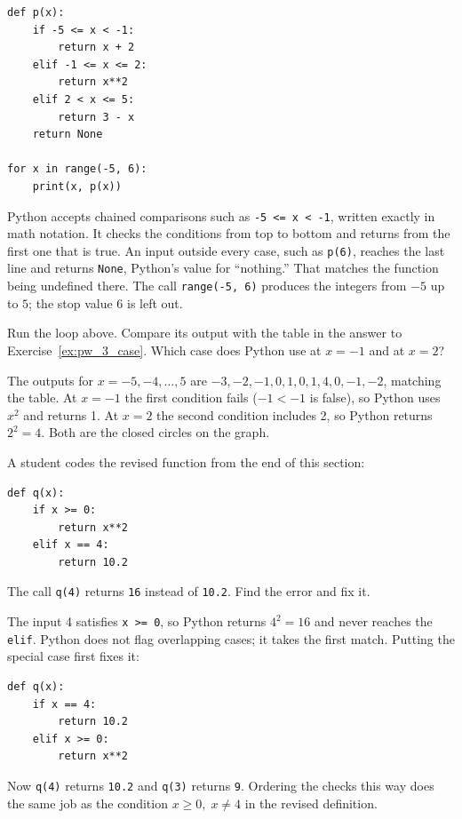 \begin{verbatim}
def p(x):
    if -5 <= x < -1:
        return x + 2
    elif -1 <= x <= 2:
        return x**2
    elif 2 < x <= 5:
        return 3 - x
    return None

for x in range(-5, 6):
    print(x, p(x))
\end{verbatim}

Python accepts chained comparisons such as \texttt{-5 <= x < -1},
written exactly in math notation. It checks the conditions from top to bottom
and returns from the first one that is true. An input outside every case,
such as \texttt{p(6)}, reaches the last line and returns
\texttt{None}, Python's value for ``nothing.'' That matches the
function being undefined there. The call \texttt{range(-5, 6)}
produces the integers from $-5$ up to $5$; the stop value 6 is left out.

\begin{Exercise}[title={Checking the table}, label={ex:functions-python-6}]
  Run the loop above. Compare its output with the table in the answer to
  Exercise~\ref{ex:pw_3_case}. Which case does Python use at $x = -1$ and at
  $x = 2$?
\end{Exercise}
\begin{Answer}[ref={ex:functions-python-6}]
  The outputs for $x = -5, -4, \ldots, 5$ are
  $-3, -2, -1, 0, 1, 0, 1, 4, 0, -1, -2$, matching the table. At $x = -1$
  the first condition fails ($-1 < -1$ is false), so Python uses $x^2$ and
  returns 1. At $x = 2$ the second condition includes 2, so Python returns
  $2^2 = 4$. Both are the closed circles on the graph.
\end{Answer}

\begin{Exercise}[title={The case that never runs}, label={ex:functions-python-7}]
  A student codes the revised function from the end of this section:
  \begin{verbatim}
def q(x):
    if x >= 0:
        return x**2
    elif x == 4:
        return 10.2
  \end{verbatim}
  The call \texttt{q(4)} returns \texttt{16}
  instead of \texttt{10.2}. Find the error and fix it.
\end{Exercise}
\begin{Answer}[ref={ex:functions-python-7}]
  The input 4 satisfies \texttt{x >= 0}, so Python returns
  $4^2 = 16$ and never reaches the \texttt{elif}. Python does
  not flag overlapping cases; it takes the first match. Putting the special
  case first fixes it:
  \begin{verbatim}
def q(x):
    if x == 4:
        return 10.2
    elif x >= 0:
        return x**2
  \end{verbatim}
  Now \texttt{q(4)} returns \texttt{10.2} and
  \texttt{q(3)} returns \texttt{9}. Ordering the
  checks this way does the same job as the condition $x \ge 0,\; x \ne 4$ in
  the revised definition.
\end{Answer}

